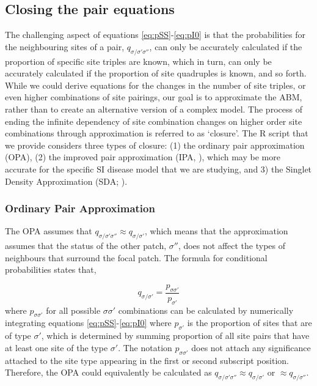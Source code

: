 \documentclass[11pt, oneside]{article}   	%
\begin{document}
\subsection{Closing the pair equations}
The challenging aspect of equations \ref{eq:pSS}-\ref{eq:pI0} is that the probabilities for the neighbouring sites of a pair, $q_{\sigma / \sigma' \sigma''}$, can only be accurately calculated if the proportion of specific site triples are known, which in turn, can only be accurately calculated if the proportion of site quadruples is known, and so forth. While we could derive equations for the changes in the number of site triples, or even higher combinations of site pairings, our goal is to approximate the ABM, rather than to create an alternative version of a complex model. The process of ending the infinite dependency of site combination changes on higher order site combinations through approximation is referred to as `closure'. The R script that we provide considers three types of closure: (1) the ordinary pair approximation (OPA), (2) the improved pair approximation (IPA, \cite{sato}), which may be more accurate for the specific SI disease model that we are studying, and 3) the Singlet Density Approximation (SDA; \cite{matsuda}).

\subsubsection{Ordinary Pair Approximation}
The OPA assumes that $q_{\sigma / \sigma' \sigma''} \approx q_{\sigma / \sigma'}$, which means that the approximation assumes that the status of the other patch, $\sigma''$, does not affect the types of neighbours that surround the focal patch. The formula for conditional probabilities states that,

\[
q_{\sigma / \sigma'} = \frac{p_{\sigma \sigma'}}{p_{\sigma'}}
\]
where $p_{\sigma \sigma'}$ for all possible $\sigma \sigma'$ combinations can be calculated by numerically integrating equations \ref{eq:pSS}-\ref{eq:pI0} where $p_{\sigma'}$ is the proportion of sites that are of type $\sigma'$, which is determined by summing proportion of all site pairs that have at least one site of the type $\sigma'$. The notation $p_{\sigma \sigma'}$ does not attach any significance attached to the site type appearing in the first or second subscript position. Therefore, the OPA could equivalently be calculated as $q_{\sigma / \sigma' \sigma''} \approx q_{\sigma / \sigma'}$ or $\approx q_{\sigma / \sigma''}$.
\end{document}

